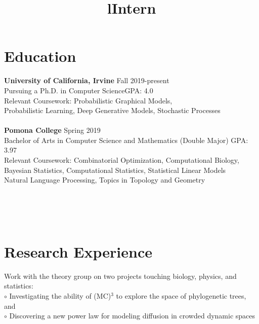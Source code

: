 \documentclass[margin]{res}
\begin{document}
\begin{resume}

\section{Education}
\textbf{University of California, Irvine} \hfill Fall 2019-present\\
Pursuing a Ph.D. in Computer Science\hfill GPA: 4.0\\
Relevant Coursework: Probabilistic Graphical Models,\\Probabilistic Learning, Deep Generative Models, Stochastic Processes\\ \\
\textbf{Pomona College} \hfill Spring 2019\\
Bachelor of Arts in Computer Science and Mathematics (Double Major) \hfill GPA: 3.97\\
Relevant Coursework: Combinatorial Optimization, Computational Biology,\\
Bayesian Statistics, Computational Statistics, Statistical Linear Models\\
Natural Language Processing, Topics in Topology and Geometry


\begin{format}
\title{l}\\
\\
\body\\
\end{format}
\section{Research Experience}

\title{\textbf{Intern}}
\begin{position}
Work with the theory group on two projects touching biology, physics, and statistics:\\
$\circ$ Investigating the ability of (MC)$^3$ to explore the space of phylogenetic trees, and \\
$\circ$ Discovering a new power law for modeling diffusion in crowded dynamic spaces
\end{position}


\end{resume}
\end{document}
